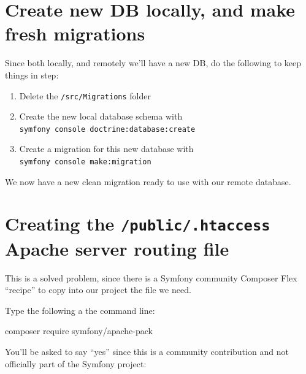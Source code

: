 \documentclass[a4paperpaper,openright]{book}
\newenvironment{Shaded}{}{}
\newcommand{\ExtensionTok}[1]{#1}
\newcommand{\NormalTok}[1]{#1}
\begin{document}
\hypertarget{create-new-db-locally-and-make-fresh-migrations}{%
\section{Create new DB locally, and make fresh
migrations}\label{create-new-db-locally-and-make-fresh-migrations}}

Since both locally, and remotely we'll have a new DB, do the following
to keep things in step:

\begin{enumerate}
\def\labelenumi{\arabic{enumi}.}
\item
  Delete the \texttt{/src/Migrations} folder
\item
  Create the new local database schema with
  \texttt{symfony\ console\ doctrine:database:create}
\item
  Create a migration for this new database with
  \texttt{symfony\ console\ make:migration}
\end{enumerate}

We now have a new clean migration ready to use with our remote database.

\hypertarget{creating-the-public.htaccess-apache-server-routing-file}{%
\section{\texorpdfstring{Creating the \texttt{/public/.htaccess} Apache
server routing
file}{Creating the /public/.htaccess Apache server routing file}}\label{creating-the-public.htaccess-apache-server-routing-file}}

This is a solved problem, since there is a Symfony community Composer
Flex ``recipe'' to copy into our project the file we need.

Type the following a the command line:

\begin{Shaded}
\begin{Highlighting}[]
    \ExtensionTok{composer}\NormalTok{ require symfony/apache-pack}
\end{Highlighting}
\end{Shaded}

You'll be asked to say ``yes'' since this is a community contribution
and not officially part of the Symfony project:
\end{document}
